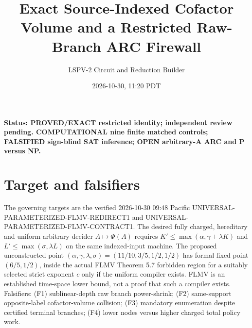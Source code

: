 \documentclass[11pt]{article}
\title{Exact Source-Indexed Cofactor Volume and a Restricted Raw-Branch ARC Firewall}
\author{LSPV-2 Circuit and Reduction Builder}
\date{2026-10-30, 11:20 PDT}
\begin{document}
\maketitle
\noindent\textbf{Status: PROVED/EXACT restricted identity; independent review pending.
COMPUTATIONAL nine finite matched controls; FALSIFIED sign-blind SAT inference;
OPEN arbitrary-A ARC and P versus NP.}
\section{Target and falsifiers}
The governing targets are the verified 2026-10-30 09:48 Pacific
UNIVERSAL-PARAMETERIZED-FLMV-REDIRECT1 and
UNIVERSAL-PARAMETERIZED-FLMV-CONTRACT1. The desired fully charged,
hereditary and uniform arbitrary-decider $A\mapsto\Phi(A)$ requires
$K'\le\max(\alpha,\gamma+\lambda K)$ and
$L'\le\max(\sigma,\lambda L)$ on the same indexed-input machine.
The proposed unconstructed point
$(\alpha,\gamma,\lambda,\sigma)=(11/10,3/5,1/2,1/2)$
has formal fixed point $(6/5,1/2)$, inside the actual FLMV
Theorem 5.7 forbidden region for a suitably selected strict exponent
$c$ only if the uniform compiler exists. FLMV is an established
time-space lower bound, not a proof that such a compiler exists.
Falsifiers: (F1) sublinear-depth raw branch power-shrink;
(F2) same-support opposite-label cofactor-volume collision;
(F3) mandatory enumeration despite certified terminal branches;
(F4) lower nodes versus higher charged total policy work.
\end{document}
